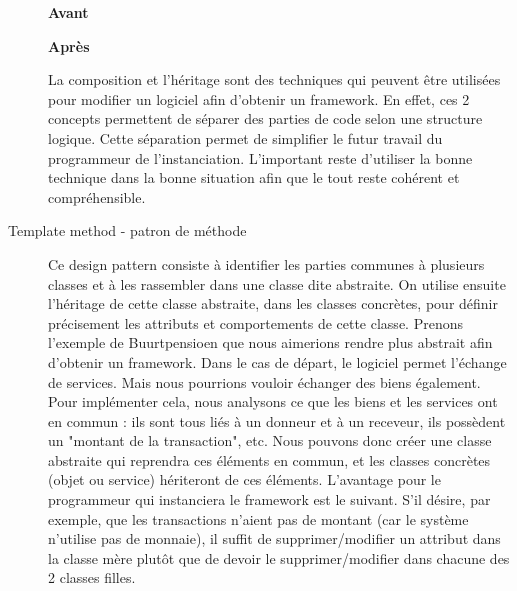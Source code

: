 \begin{description}
\vspace{0.3cm}
\begin{minipage}{.5\textwidth}
\begin{center} \textbf{Avant}

\end{center}
\end{minipage}
\hspace{0.3cm}
\begin{minipage}{.5\textwidth}
\begin{center} \textbf{Après}\end{center}


\end{minipage}
\vspace{0.3cm}

La composition et l'héritage sont des techniques qui peuvent être utilisées pour modifier un logiciel afin d'obtenir un framework.  En effet,  ces 2 concepts permettent de séparer des parties de code selon une structure logique.  Cette séparation permet de simplifier le futur travail du programmeur de l'instanciation.  L'important reste d'utiliser la bonne technique dans la bonne situation afin que le tout reste cohérent et compréhensible.  


\item[Template method - patron de méthode]
Ce design pattern consiste à identifier les parties communes à plusieurs classes et à les rassembler dans une classe dite abstraite.  On utilise ensuite l'héritage de cette classe abstraite,  dans les classes concrètes,  pour définir précisement les attributs et comportements de cette classe.  Prenons l'exemple de Buurtpensioen que nous aimerions rendre plus abstrait afin d'obtenir un framework.  Dans le cas de départ,  le logiciel permet l'échange de services.  Mais nous pourrions vouloir échanger des biens également.  Pour implémenter cela,  nous analysons ce que les biens et les services ont en commun : ils sont tous liés à un donneur et à un receveur,  ils possèdent un "montant de la transaction",  etc.  Nous pouvons donc créer une classe abstraite qui reprendra ces éléments en commun,  et les classes concrètes (objet ou service) hériteront de ces éléments.  L'avantage pour le programmeur qui instanciera le framework est le suivant.  S'il désire,  par exemple,  que les transactions n'aient pas de montant (car le système n'utilise pas de monnaie),  il suffit de supprimer/modifier un attribut dans la classe mère plutôt que de devoir le supprimer/modifier dans chacune des 2 classes filles.


\end{description}
